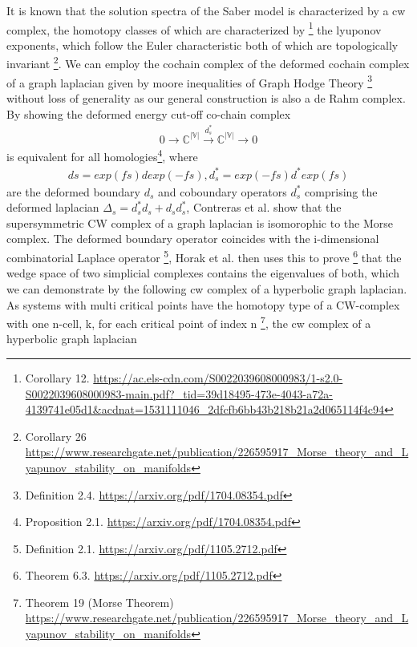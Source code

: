 \documentclass{article}
\begin{document}
It is known that the solution spectra of the Saber model is characterized by a cw complex, the homotopy classes of which are characterized by \footnote{Corollary 12. \url{https://ac.els-cdn.com/S0022039608000983/1-s2.0-S0022039608000983-main.pdf?_tid=39d18495-473e-4043-a72a-4139741e05d1&acdnat=1531111046_2dfcfb6bb43b218b21a2d065114f4c94}}  the lyuponov exponents, which follow the Euler characteristic both of which are topologically invariant \footnote{Corollary 26 \url{https://www.researchgate.net/publication/226595917_Morse_theory_and_Lyapunov_stability_on_manifolds}}. We can employ the cochain complex of the deformed cochain complex of a graph laplacian given by moore inequalities of Graph Hodge Theory \footnote{Definition 2.4. \url{https://arxiv.org/pdf/1704.08354.pdf}} without loss of generality as our general construction is also a de Rahm complex. By showing the deformed energy cut-off co-chain complex
\begin{equation} \label{eq1}
\begin{split}
0 \rightarrow \mathbb{C^{|V|}} \xrightarrow{d^{*}_s} \mathbb{C^{|V|}} \rightarrow 0
\end{split}
\end{equation}
is equivalent for all homologies\footnote{Proposition 2.1. \url{https://arxiv.org/pdf/1704.08354.pdf}}, where
\begin{equation} \label{eq1}
\begin{split}
ds = exp(fs)d exp(-fs), d^{*}_s = exp(-fs)d^*exp(fs)
\end{split}
\end{equation}
are the deformed boundary $d_s$ and coboundary operators $d^{*}_s$ comprising the deformed laplacian $\Delta_s = d^{*}_s d_s + d_s d^{*}_s$, Contreras et al. show that the supersymmetric CW complex of a graph laplacian is isomorophic to the Morse complex. The deformed boundary operator coincides with the i-dimensional combinatorial Laplace operator \footnote{Definition 2.1. \url{https://arxiv.org/pdf/1105.2712.pdf}}, Horak et al. then uses this to prove \footnote{Theorem 6.3. \url{https://arxiv.org/pdf/1105.2712.pdf}} that the wedge space of two simplicial complexes contains the eigenvalues of both, which we can demonstrate by the following cw complex of a hyperbolic graph laplacian. As systems with multi critical points have the homotopy type of a CW-complex with one n-cell, k, for each critical point of index n \footnote{Theorem 19 (Morse Theorem) \url{https://www.researchgate.net/publication/226595917_Morse_theory_and_Lyapunov_stability_on_manifolds}}, the cw complex of a hyperbolic graph laplacian
\end{document}
